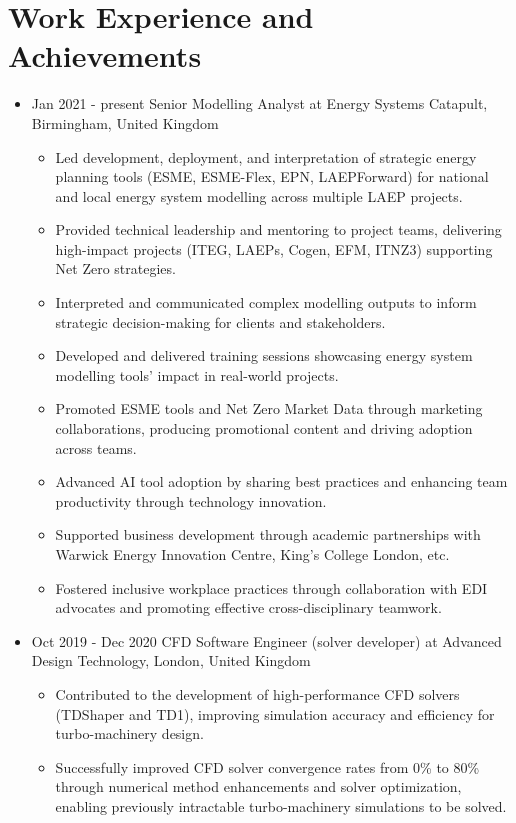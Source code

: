 \documentclass[letterpaper]{article}
\begin{document}
\section*{Work Experience and Achievements}
\begin{itemize}
\item Jan 2021 - present \hspace{2pt} Senior Modelling Analyst at Energy Systems Catapult, Birmingham, United Kingdom
  \begin{itemize}
    \item Led development, deployment, and interpretation of strategic energy planning tools (ESME, ESME-Flex, EPN, LAEPForward) for national and local energy system modelling across multiple LAEP projects.
    \item Provided technical leadership and mentoring to project teams, delivering high-impact projects (ITEG, LAEPs, Cogen, EFM, ITNZ3) supporting Net Zero strategies.
    \item Interpreted and communicated complex modelling outputs to inform strategic decision-making for clients and stakeholders.
    \item Developed and delivered training sessions showcasing energy system modelling tools' impact in real-world projects.
    \item Promoted ESME tools and Net Zero Market Data through marketing collaborations, producing promotional content and driving adoption across teams.
    \item Advanced AI tool adoption by sharing best practices and enhancing team productivity through technology innovation.
    \item Supported business development through academic partnerships with Warwick Energy Innovation Centre, King's College London, etc.
    \item Fostered inclusive workplace practices through collaboration with EDI advocates and promoting effective cross-disciplinary teamwork.
  \end{itemize}
\item Oct 2019 - Dec 2020 \hspace{2pt} CFD Software Engineer (solver developer) at Advanced Design Technology, London, United Kingdom
   \begin{itemize}
   \item Contributed to the development of high-performance CFD solvers (TDShaper and TD1), improving simulation accuracy and efficiency for turbo-machinery design.
   \item Successfully improved CFD solver convergence rates from 0\% to 80\% through numerical method enhancements and solver optimization, enabling previously intractable turbo-machinery simulations to be solved.

\end{itemize}
\end{itemize}
\end{document}
